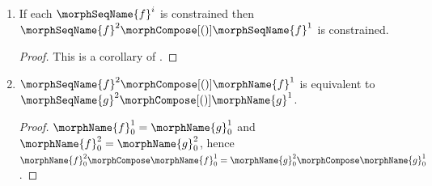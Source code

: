 \documentclass{article}
\begin{document}
\begin{lemma}
\begin{enumerate}
\item
\label{M-morphcomp:constcompconst}
If each $\morphSeqName{f}^i$ is constrained then
$\morphSeqName{f}^2 \morphCompose[()] \morphSeqName{f}^1$ is constrained.

\begin{proof}
This is a corollary of .
\end{proof}

\item
\label{M-morphcomp:compequivcomp}
$\morphSeqName{f}^2 \morphCompose[()] \morphName{f}^1$ is equivalent to
$\morphSeqName{g}^2 \morphCompose[()] \morphName{g}^1$.

\begin{proof}
$\morphName{f}^1_0 = \morphName{g}^1_0$ and
$\morphName{f}^2_0 = \morphName{g}^2_0$, hence
$
  \morphName{f}^2_0 \morphCompose \morphName{f}^1_0 =
  \morphName{g}^2_0 \morphCompose \morphName{g}^1_0
$.
\end{proof}
\end{enumerate}
\end{lemma}
\end{document}

